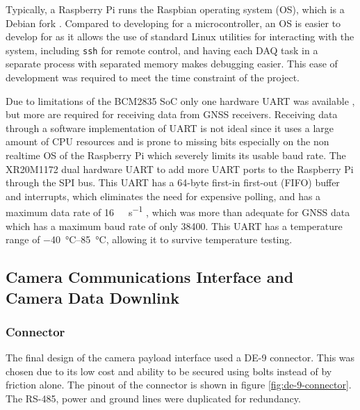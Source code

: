\documentclass{report}
\begin{document}
Typically, a Raspberry Pi runs the Raspbian operating system (OS), which is a Debian fork \cite{upton2016raspberry}. Compared to developing for a microcontroller, an OS is easier to develop for as it allows the use of standard Linux utilities for interacting with the system, including \texttt{ssh} for remote control, and having each DAQ task in a separate process with separated memory makes debugging easier. This ease of development was required to meet the time constraint of the project.

Due to limitations of the BCM2835 SoC only one hardware UART was available \cite{upton2016raspberry}, but more are required for receiving data from GNSS receivers. Receiving data through a software implementation of UART is not ideal since it uses a large amount of CPU resources and is prone to missing bits especially on the non realtime OS of the Raspberry Pi which severely limits its usable baud rate. The XR20M1172 dual hardware UART to add more UART ports to the Raspberry Pi through the SPI bus. This UART has a 64-byte first-in first-out (FIFO) buffer and interrupts, which eliminates the need for expensive polling, and has a maximum data rate of \SI{16}{\mega\bit\per\second} \cite{maxlinear2022xr20m1172}, which was more than adequate for GNSS data which has a maximum baud rate of only \SI{38400}{\baud}. This UART has a temperature range of \SIrange{-40}{85}{\degreeCelsius}, allowing it to survive temperature testing.

\subsection{Camera Communications Interface and Camera Data Downlink}

\subsubsection{Connector}
The final design of the camera payload interface used a DE-9 connector. This was chosen due to its low cost and ability to be secured using bolts instead of by friction alone. The pinout of the connector is shown in figure \ref{fig:de-9-connector}. The RS-485, power and ground lines were duplicated for redundancy.
\end{document}
